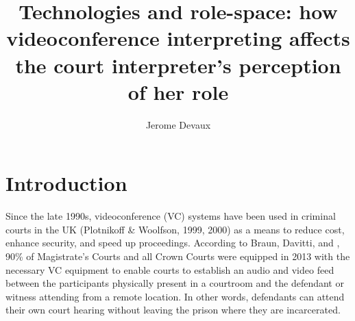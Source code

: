 \documentclass[output=paper]{langsci/langscibook}
\author{Jerome Devaux\affiliation{affiliation}}
\title{Technologies and role-space: how videoconference interpreting affects the court interpreter’s perception of her role}
\begin{document}

 

 

 

 

 

 

 

 

 

 

 

\section{Introduction}
Since the late 1990s, videoconference (VC) systems have been used in criminal courts in the UK (Plotnikoff \& Woolfson, 1999, 2000) as a means to reduce cost, enhance security, and speed up proceedings. According to Braun, Davitti, and \citet{Dicerto2016}, 90\% of Magistrate’s Courts and all Crown Courts were equipped in 2013 with the necessary VC equipment to enable courts to establish an audio and video feed between the participants physically present in a courtroom and the defendant or witness attending from a remote location. In other words, defendants can attend their own court hearing without leaving the prison where they are incarcerated. 
\end{document}
